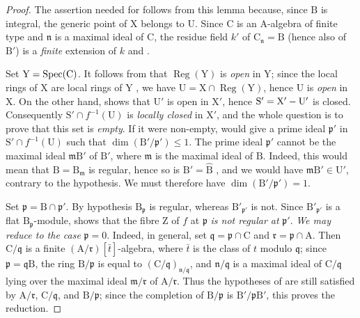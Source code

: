 \begin{proof}
The assertion needed for  follows from this lemma because, since $\mathrm{B}$ is integral, the generic point of $\mathrm{X}$ belongs to $\mathrm{U}$.
Since $\mathrm{C}$ is an $\mathrm{A}$-algebra of finite type and $\mathfrak{n}$ is a maximal ideal of $\mathrm{C}$, the residue field $k'$ of $\mathrm{C}_\mathfrak{n}=\mathrm{B}$ (hence also of $\mathrm{B}'$) is a \emph{finite} extension of $k$  and .

Set $\mathrm{Y}=\operatorname{Spec}(\mathrm{C})$. It follows from  that $\operatorname{Reg}(\mathrm{Y})$ is \emph{open} in $\mathrm{Y}$; since the local rings of $\mathrm{X}$ are local rings of $\mathrm{Y}$ , we have $\mathrm{U}=\mathrm{X}\cap\operatorname{Reg}(\mathrm{Y})$, hence $\mathrm{U}$ is \emph{open} in $\mathrm{X}$. On the other hand,  shows that $\mathrm{U}'$ is open in $\mathrm{X}'$, hence $\mathrm{S}'=\mathrm{X}'-\mathrm{U}'$ is closed. Consequently $\mathrm{S}'\cap f^{-1}(\mathrm{U})$ is \emph{locally closed} in $\mathrm{X}'$, and the whole question is to prove that this set is \emph{empty}.
If it were non-empty,  would give a prime ideal $\mathfrak{p}'$ in $\mathrm{S}'\cap f^{-1}(\mathrm{U})$ such that $\dim(\mathrm{B}'/\mathfrak{p}')\leqslant 1$.
The prime ideal $\mathfrak{p}'$ cannot be the maximal ideal $\mathfrak{m}\mathrm{B}'$ of $\mathrm{B}'$, where $\mathfrak{m}$ is the maximal ideal of $\mathrm{B}$. Indeed, this would mean that $\mathrm{B}=\mathrm{B}_\mathfrak{m}$ is regular, hence so is $\mathrm{B}'=\widehat{\mathrm{B}}$ , and we would have $\mathfrak{m}\mathrm{B}'\in\mathrm{U}'$, contrary to the hypothesis. We must therefore have $\dim(\mathrm{B}'/\mathfrak{p}')=1$.

Set $\mathfrak{p}=\mathrm{B}\cap\mathfrak{p}'$. By hypothesis $\mathrm{B}_\mathfrak{p}$ is regular, whereas $\mathrm{B}'_{\mathfrak{p}'}$ is not. Since $\mathrm{B}'_{\mathfrak{p}'}$ is a flat $\mathrm{B}_\mathfrak{p}$-module,  shows that the fibre $\mathrm{Z}$ of $f$ at $\mathfrak{p}$ \emph{is not regular at} $\mathfrak{p}'$.
\emph{We may reduce to the case} $\mathfrak{p}=0$. Indeed, in general, set $\mathfrak{q}=\mathfrak{p}\cap\mathrm{C}$ and $\mathfrak{r}=\mathfrak{p}\cap\mathrm{A}$. Then $\mathrm{C}/\mathfrak{q}$ is a finite $(\mathrm{A}/\mathfrak{r})[\bar{t}]$-algebra, where $\bar{t}$ is the class of $t$ modulo $\mathfrak{q}$; since $\mathfrak{p}=\mathfrak{q}\mathrm{B}$, the ring $\mathrm{B}/\mathfrak{p}$ is equal to $(\mathrm{C}/\mathfrak{q})_{\mathfrak{n}/\mathfrak{q}}$, and $\mathfrak{n}/\mathfrak{q}$ is a maximal ideal of $\mathrm{C}/\mathfrak{q}$ lying over the maximal ideal $\mathfrak{m}/\mathfrak{r}$ of $\mathrm{A}/\mathfrak{r}$. Thus the hypotheses of  are still satisfied by $\mathrm{A}/\mathfrak{r}$, $\mathrm{C}/\mathfrak{q}$, and $\mathrm{B}/\mathfrak{p}$; since the completion of $\mathrm{B}/\mathfrak{p}$ is $\mathrm{B}'/\mathfrak{p}\mathrm{B}'$, this proves the reduction.


\end{proof}
